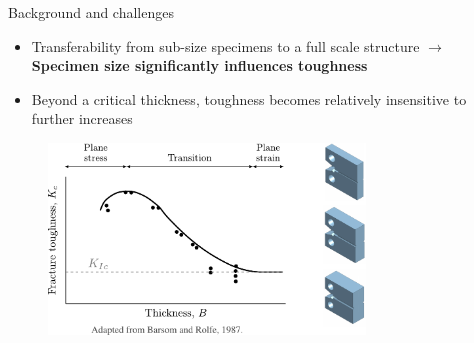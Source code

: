\documentclass[9pt]{beamer}
\begin{document}
\begin{frame}{Background and challenges}

\begin{itemize}
    \item Transferability from sub-size specimens to a full scale structure $\rightarrow$ \textbf{Specimen size significantly influences toughness}
    \vspace{0.15cm}
    \item Beyond a critical thickness, toughness becomes relatively insensitive to further increases
\end{itemize}

\begin{figure}
    \centering
    \includegraphics[width=0.75\textwidth]{Images/plateau_plane_strain.pdf}
\end{figure}


\end{frame}

\end{document}
